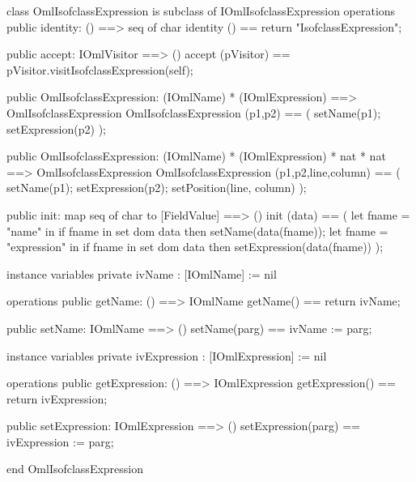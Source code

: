 \begin{vdm_al}
class OmlIsofclassExpression is subclass of IOmlIsofclassExpression
operations
  public identity: () ==> seq of char
  identity () == return "IsofclassExpression";

  public accept: IOmlVisitor ==> ()
  accept (pVisitor) == pVisitor.visitIsofclassExpression(self);

  public OmlIsofclassExpression:
    (IOmlName) *
    (IOmlExpression) ==> OmlIsofclassExpression
  OmlIsofclassExpression (p1,p2) == 
    ( setName(p1);
      setExpression(p2) );

  public OmlIsofclassExpression:
    (IOmlName) *
    (IOmlExpression) *
    nat *
    nat ==> OmlIsofclassExpression
  OmlIsofclassExpression (p1,p2,line,column) == 
    ( setName(p1);
      setExpression(p2);
      setPosition(line, column) );

  public init: map seq of char to [FieldValue] ==> ()
  init (data) ==
    ( let fname = "name" in
        if fname in set dom data
        then setName(data(fname));
      let fname = "expression" in
        if fname in set dom data
        then setExpression(data(fname)) );

instance variables
  private ivName : [IOmlName] := nil

operations
  public getName: () ==> IOmlName
  getName() == return ivName;

  public setName: IOmlName ==> ()
  setName(parg) == ivName := parg;

instance variables
  private ivExpression : [IOmlExpression] := nil

operations
  public getExpression: () ==> IOmlExpression
  getExpression() == return ivExpression;

  public setExpression: IOmlExpression ==> ()
  setExpression(parg) == ivExpression := parg;

end OmlIsofclassExpression
\end{vdm_al}

